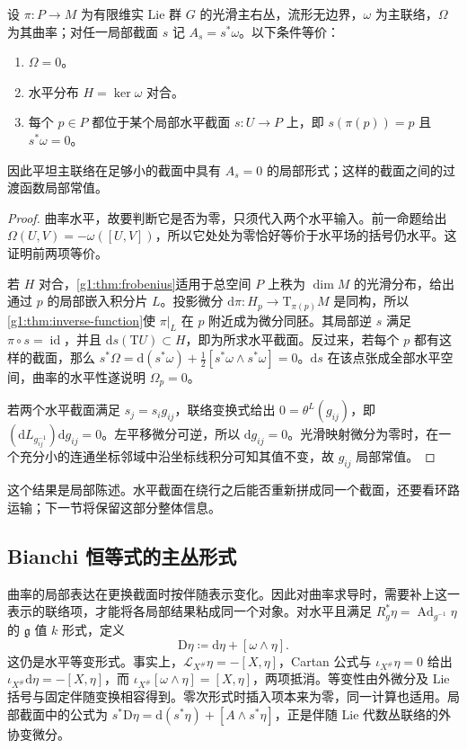 \begin{theorem}\label{g1:thm:flat-principal-local-section}
	设 \(\pi:P\to M\) 为有限维实 Lie 群 \(G\) 的光滑主右丛，流形无边界，\(\omega\) 为主联络，\(\Omega\) 为其曲率；对任一局部截面 \(s\) 记 \(A_s=s^*\omega\)。以下条件等价：
	\begin{enumerate}
		\item \(\Omega=0\)。
		\item 水平分布 \(H=\ker\omega\) 对合。
		\item 每个 \(p\in P\) 都位于某个局部水平截面 \(s:U\to P\) 上，即 \(s(\pi(p))=p\) 且 \(s^*\omega=0\)。
	\end{enumerate}
	因此平坦主联络在足够小的截面中具有 \(A_s=0\) 的局部形式；这样的截面之间的过渡函数局部常值。
\end{theorem}
\begin{proof}
	曲率水平，故要判断它是否为零，只须代入两个水平输入。前一命题给出 \(\Omega(U,V)=-\omega([U,V])\)，所以它处处为零恰好等价于水平场的括号仍水平。这证明前两项等价。

	若 \(H\) 对合，\cref{g1:thm:frobenius}适用于总空间 \(P\) 上秩为 \(\dim M\) 的光滑分布，给出通过 \(p\) 的局部嵌入积分片 \(L\)。投影微分 \(\mathrm{d}\pi:H_p\to \mathrm{T}_{\pi(p)}M\) 是同构，所以\cref{g1:thm:inverse-function}使 \(\pi|_L\) 在 \(p\) 附近成为微分同胚。其局部逆 \(s\) 满足 \(\pi\circ s=\operatorname{id}\)，并且 \(\mathrm{d}s(\mathrm{T}U)\subset H\)，即为所求水平截面。反过来，若每个 \(p\) 都有这样的截面，那么 \(s^*\Omega=\mathrm{d}(s^*\omega)+\tfrac12[s^*\omega\wedge s^*\omega]=0\)。\(\mathrm{d}s\) 在该点张成全部水平空间，曲率的水平性遂说明 \(\Omega_p=0\)。

	若两个水平截面满足 \(s_j=s_i g_{ij}\)，联络变换式给出 \(0=\theta^L(g_{ij})\)，即 \((\mathrm{d}L_{g_{ij}^{-1}})\mathrm{d}g_{ij}=0\)。左平移微分可逆，所以 \(\mathrm{d}g_{ij}=0\)。光滑映射微分为零时，在一个充分小的连通坐标邻域中沿坐标线积分可知其值不变，故 \(g_{ij}\) 局部常值。
\end{proof}

这个结果是局部陈述。水平截面在绕行之后能否重新拼成同一个截面，还要看环路运输；下一节将保留这部分整体信息。

\subsection{Bianchi 恒等式的主丛形式}
\label{g1:subsec:1803:03}

曲率的局部表达在更换截面时按伴随表示变化。因此对曲率求导时，需要补上这一表示的联络项，才能将各局部结果粘成同一个对象。对水平且满足 \(R_g^*\eta=\operatorname{Ad}_{g^{-1}}\eta\) 的 \(\mathfrak g\) 值 \(k\) 形式，定义
\begin{equation}\label{g1:eq:principal-exterior-covariant-derivative}
	\mathrm{D}\eta\coloneqq\mathrm{d}\eta+[\omega\wedge\eta].
\end{equation}
这仍是水平等变形式。事实上，\(\mathcal L_{X^\#}\eta=-[X,\eta]\)，Cartan 公式与 \(\iota_{X^\#}\eta=0\) 给出 \(\iota_{X^\#}\mathrm{d}\eta=-[X,\eta]\)，而 \(\iota_{X^\#}[\omega\wedge\eta]=[X,\eta]\)，两项抵消。等变性由外微分及 Lie 括号与固定伴随变换相容得到。零次形式时插入项本来为零，同一计算也适用。局部截面中的公式为 \(s^*\mathrm{D}\eta=\mathrm{d}(s^*\eta)+[A\wedge s^*\eta]\)，正是伴随 Lie 代数丛联络的外协变微分。

